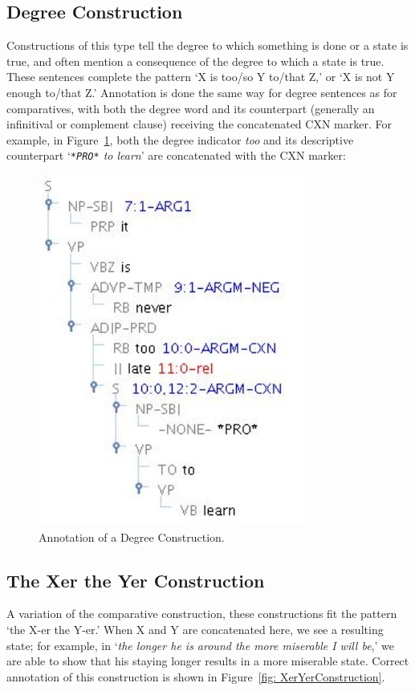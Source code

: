 \documentclass[11pt]{report}
\begin{document}
\subsection{Degree Construction}
Constructions of this type tell the degree to which something is done or a state is true, and often mention a consequence of the degree to which a state is true. These sentences complete the pattern `X is too/so Y to/that Z,' or `X is not Y enough to/that Z.'  Annotation is done the same way for degree sentences as for comparatives, with both the degree word and its counterpart (generally an infinitival or complement clause) receiving the concatenated CXN marker.  For example, in Figure~\ref{fig: DegreeConstruction}, both the degree indicator \textit{too} and its descriptive counterpart `\textit{\texttt{*PRO*} to learn}' are concatenated with the CXN marker: 

\begin{figure}[htbp]
\centering
\includegraphics[scale=0.6]{img/tooLate.jpg}
\caption{Annotation of a Degree Construction.}
\label{fig: DegreeConstruction}
\end{figure}

\subsection{The Xer the Yer Construction}
A variation of the comparative construction, these constructions fit the pattern `the X-er the Y-er.'  When X and Y are concatenated here, we see a resulting state; for example, in `\textit{the longer he is around the more miserable I will be},' we are able to show that his staying longer results in a more miserable state. Correct annotation of this construction is shown in Figure~\ref{fig: XerYerConstruction}. 
\end{document}
